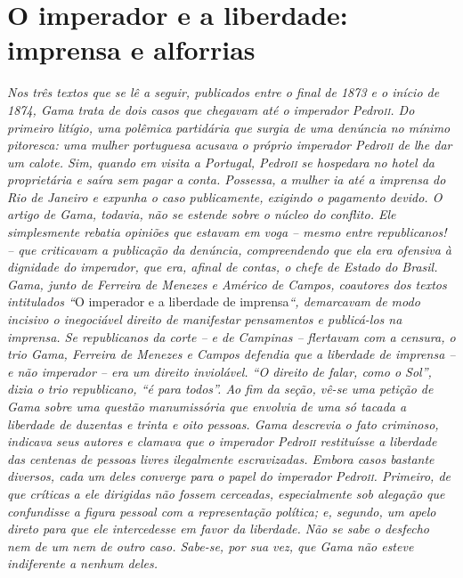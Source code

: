 \part{O imperador e a liberdade: imprensa e alforrias}

\begin{didascalia}
\emph{Nos três textos que se lê a seguir, publicados entre o final de
1873 e o início de 1874, Gama trata de dois casos que chegavam até o
imperador Pedro\textsc{ii}. Do primeiro litígio, uma polêmica partidária que
surgia de uma denúncia no mínimo pitoresca: uma mulher portuguesa
acusava o próprio imperador Pedro\textsc{ii} de lhe dar um calote. Sim, quando
em visita a Portugal, Pedro\textsc{ii} se hospedara no hotel da proprietária e
saíra sem pagar a conta. Possessa, a mulher ia até a imprensa do Rio de
Janeiro e expunha o caso publicamente, exigindo o pagamento devido. O
artigo de Gama, todavia, não se estende sobre o núcleo do conflito. Ele
simplesmente rebatia opiniões que estavam em voga -- mesmo entre
republicanos! -- que criticavam a publicação da denúncia, compreendendo
que ela era ofensiva à dignidade do imperador, que era, afinal de
contas, o chefe de Estado do Brasil. Gama, junto de Ferreira de Menezes
e Américo de Campos, coautores dos textos intitulados ``}O imperador e a
liberdade de imprensa\emph{``, demarcavam de modo incisivo o inegociável
direito de manifestar pensamentos e publicá-los na imprensa. Se
republicanos da corte -- e de Campinas -- flertavam com a censura, o
trio Gama, Ferreira de Menezes e Campos defendia que a liberdade de
imprensa -- e não imperador -- era um direito inviolável. ``O direito de
falar, como o Sol'', dizia o trio republicano, ``é para todos''. Ao fim da
seção, vê-se uma petição de Gama sobre uma questão manumissória que
envolvia de uma só tacada a liberdade de duzentas e trinta e oito
pessoas. Gama descrevia o fato criminoso, indicava seus autores e
clamava que o imperador Pedro\textsc{ii} restituísse a liberdade das centenas de
pessoas livres ilegalmente escravizadas. Embora casos bastante diversos,
cada um deles converge para o papel do imperador Pedro\textsc{ii}. Primeiro, de
que críticas a ele dirigidas não fossem cerceadas, especialmente sob
alegação que confundisse a figura pessoal com a representação política;
e, segundo, um apelo direto para que ele intercedesse em favor da
liberdade. Não se sabe o desfecho nem de um nem de outro caso. Sabe-se,
por sua vez, que Gama não esteve indiferente a nenhum deles.}
\end{didascalia}

